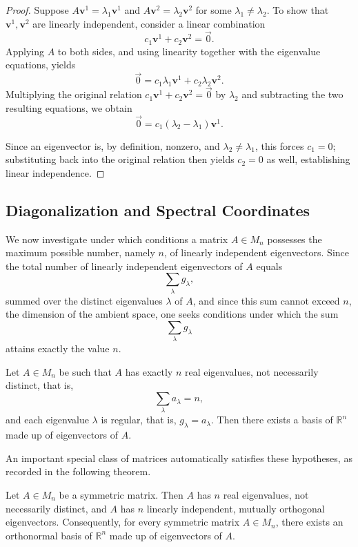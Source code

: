 \begin{proof}
Suppose $A\mathbf{v}^1 = \lambda_1 \mathbf{v}^1$ and $A\mathbf{v}^2 = \lambda_2 \mathbf{v}^2$ for some $\lambda_1 \neq \lambda_2$. To show that $\mathbf{v}^1, \mathbf{v}^2$ are linearly independent, consider a linear combination
\[
c_1 \mathbf{v}^1 + c_2 \mathbf{v}^2 = \vec{0}.
\]
Applying $A$ to both sides, and using linearity together with the eigenvalue equations, yields
\[
\vec{0} = c_1 \lambda_1 \mathbf{v}^1 + c_2 \lambda_2 \mathbf{v}^2.
\]
Multiplying the original relation $c_1 \mathbf{v}^1 + c_2 \mathbf{v}^2 = \vec{0}$ by $\lambda_2$ and subtracting the two resulting equations, we obtain
\[
\vec{0} = c_1(\lambda_2 - \lambda_1) \mathbf{v}^1.
\]

Since an eigenvector is, by definition, nonzero, and $\lambda_2 \neq \lambda_1$, this forces $c_1 = 0$; substituting back into the original relation then yields $c_2 = 0$ as well, establishing linear independence.
\end{proof}

\subsection{Diagonalization and Spectral Coordinates}

We now investigate under which conditions a matrix $A \in M_n$ possesses the maximum possible number, namely $n$, of linearly independent eigenvectors. Since the total number of linearly independent eigenvectors of $A$ equals \[
\sum_\lambda g_\lambda,
\] summed over the distinct eigenvalues $\lambda$ of $A$, and since this sum cannot exceed $n$, the dimension of the ambient space, one seeks conditions under which the sum \[
\sum_\lambda g_\lambda
\] attains exactly the value $n$.

\begin{proposition}
Let $A \in M_n$ be such that $A$ has exactly $n$ real eigenvalues, not necessarily distinct, that is, \[
\sum_\lambda a_\lambda = n,
\] and each eigenvalue $\lambda$ is regular, that is, $g_\lambda = a_\lambda$. Then there exists a basis of $\mathbb{R}^n$ made up of eigenvectors of $A$.
\end{proposition}

An important special class of matrices automatically satisfies these hypotheses, as recorded in the following theorem.

\begin{theorem}
Let $A \in M_n$ be a symmetric matrix. Then $A$ has $n$ real eigenvalues, not necessarily distinct, and $A$ has $n$ linearly independent, mutually orthogonal eigenvectors. Consequently, for every symmetric matrix $A \in M_n$, there exists an orthonormal basis of $\mathbb{R}^n$ made up of eigenvectors of $A$.
\end{theorem}


